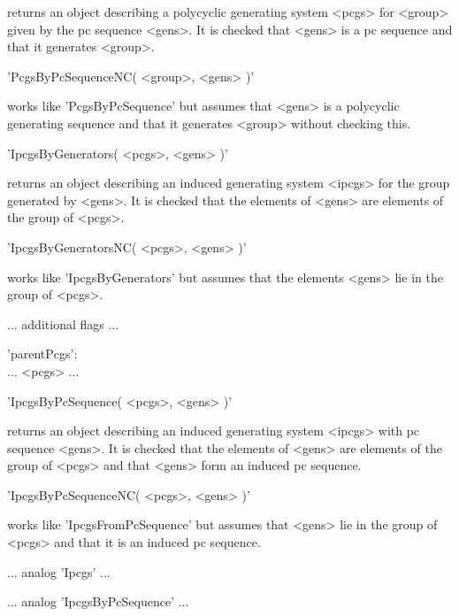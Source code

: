returns  an object describing a   polycyclic generating system <pcgs> for
<group> given by the pc sequence <gens>.  It is checked  that <gens> is a
pc sequence and that it generates <group>.

'PcgsByPcSequenceNC( <group>, <gens> )'

works like  'PcgsByPcSequence'  but assumes that  <gens>  is a polycyclic
generating sequence and that it generates <group> without checking this.


'IpcgsByGenerators( <pcgs>, <gens> )'

returns an object describing an induced generating system <ipcgs> for the
group generated by <gens>.  It is checked that the elements of <gens> are
elements of the group of <pcgs>.

'IpcgsByGeneratorsNC( <pcgs>, <gens> )'

works like 'IpcgsByGenerators'  but assumes that  the elements <gens> lie
in the group of <pcgs>.

... additional flags ...

'parentPcgs': \\
    ... <pcgs> ...


'IpcgsByPcSequence( <pcgs>, <gens> )'

returns an object describing an induced generating system <ipcgs> with pc
sequence <gens>.  It is checked that the elements  of <gens> are elements
of the group of <pcgs> and that <gens> form an induced pc sequence.

'IpcgsByPcSequenceNC( <pcgs>, <gens> )'

works like 'IpcgsFromPcSequence' but assumes that <gens> lie in the group
of <pcgs> and that it is an induced pc sequence.


... analog 'Ipcgs' ...


... analog 'IpcgsByPcSequence' ...



